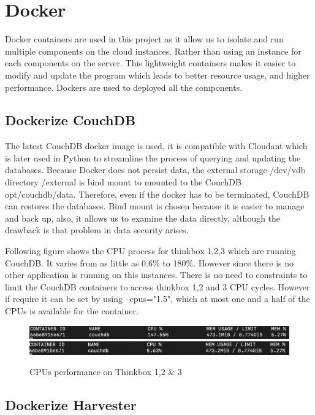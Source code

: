 \section{Docker}
Docker containers are used in this project as it allow us to isolate and run multiple components on the cloud instances. Rather than using an instance for each components on the server. This lightweight containers makes it easier to modify and update the program which leads to better resource usage, and higher performance. Dockers are used to deployed all the components.

\subsection{Dockerize CouchDB}

The latest CouchDB docker image is used, it is compatible with Cloudant which is later used in Python to streamline the process of querying and updating the databases. Because Docker does not persist data, the external storage /dev/vdb directory /external is bind mount to mounted to the CouchDB opt/couchdb/data. Therefore, even if the docker has to be terminated, CouchDB can restores the databases. Bind mount is chosen because it is easier to manage and back up, also, it allows us to examine the data directly, although the drawback is that problem in data security arises. 

Following figure shows the CPU process for thinkbox 1,2,3 which are running CouchDB. It varies from as little as 0.6\% to 180\%. However since there is no other application is running on this instances. There is no need to constraints to limit the CouchDB containers to access thinkbox 1,2 and 3 CPU cycles. However if require it can be set by using --cpus="1.5", which at most one and a half of the CPUs is available for the container.

\begin{figure}[h]
\centering
\includegraphics[width=1.0\textwidth]{city_analytics/report/images/CPUthinkbox.png}
\includegraphics[width=1.0\textwidth]{city_analytics/report/images/couchdb1.png}
\caption{CPUs performance on Thinkbox 1,2 & 3}
\end{figure}

\subsection{Dockerize Harvester}

